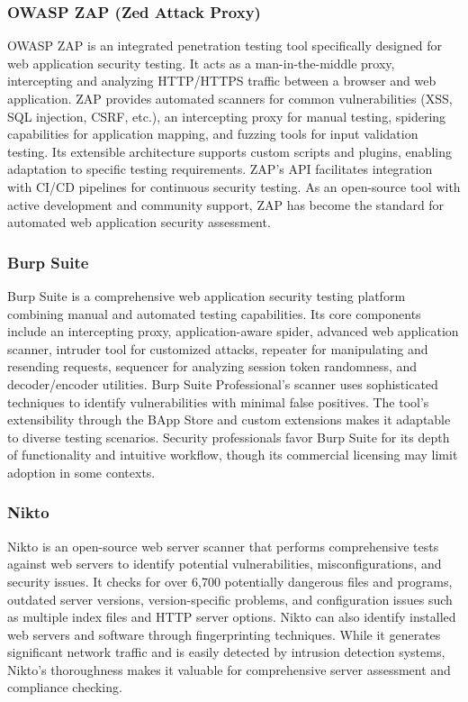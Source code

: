 \documentclass[12pt,a4paper]{report}
\begin{document}
\subsubsection{OWASP ZAP (Zed Attack Proxy)}

OWASP ZAP is an integrated penetration testing tool specifically designed for web application security testing. It acts as a man-in-the-middle proxy, intercepting and analyzing HTTP/HTTPS traffic between a browser and web application. ZAP provides automated scanners for common vulnerabilities (XSS, SQL injection, CSRF, etc.), an intercepting proxy for manual testing, spidering capabilities for application mapping, and fuzzing tools for input validation testing. Its extensible architecture supports custom scripts and plugins, enabling adaptation to specific testing requirements. ZAP's API facilitates integration with CI/CD pipelines for continuous security testing. As an open-source tool with active development and community support, ZAP has become the standard for automated web application security assessment.

\subsubsection{Burp Suite}

Burp Suite is a comprehensive web application security testing platform combining manual and automated testing capabilities. Its core components include an intercepting proxy, application-aware spider, advanced web application scanner, intruder tool for customized attacks, repeater for manipulating and resending requests, sequencer for analyzing session token randomness, and decoder/encoder utilities. Burp Suite Professional's scanner uses sophisticated techniques to identify vulnerabilities with minimal false positives. The tool's extensibility through the BApp Store and custom extensions makes it adaptable to diverse testing scenarios. Security professionals favor Burp Suite for its depth of functionality and intuitive workflow, though its commercial licensing may limit adoption in some contexts.

\subsubsection{Nikto}

Nikto is an open-source web server scanner that performs comprehensive tests against web servers to identify potential vulnerabilities, misconfigurations, and security issues. It checks for over 6,700 potentially dangerous files and programs, outdated server versions, version-specific problems, and configuration issues such as multiple index files and HTTP server options. Nikto can also identify installed web servers and software through fingerprinting techniques. While it generates significant network traffic and is easily detected by intrusion detection systems, Nikto's thoroughness makes it valuable for comprehensive server assessment and compliance checking.
\end{document}

